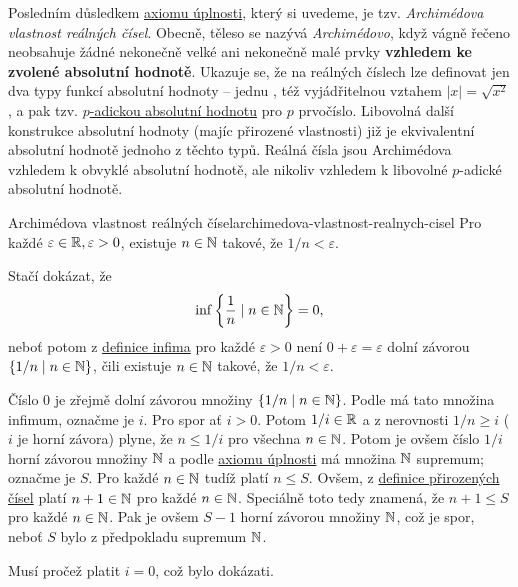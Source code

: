 Posledním důsledkem \hyperref[prop:axiom-uplnosti]{axiomu úplnosti}, který si
uvedeme, je tzv. \emph{Archimédova vlastnost reálných čísel}. Obecně, těleso se
nazývá \emph{Archimédovo}, když vágně řečeno neobsahuje žádné nekonečně velké
ani nekonečně malé prvky \textbf{vzhledem ke zvolené absolutní hodnotě}. Ukazuje
se, že na reálných číslech lze definovat jen dva typy funkcí absolutní hodnoty
-- jednu , též vyjádřitelnou vztahem $|x| = \sqrt{x^2}$, a pak tzv.
\href{https://en.wikipedia.org/wiki/P-adic_valuation}{$p$-adickou absolutní
hodnotu} pro $p$ prvočíslo. Libovolná další konstrukce absolutní hodnoty
(majíc přirozené vlastnosti) již je ekvivalentní absolutní hodnotě jednoho z
těchto typů. Reálná čísla jsou Archimédova vzhledem k obvyklé absolutní hodnotě,
ale nikoliv vzhledem k libovolné $p$-adické absolutní hodnotě.

\begin{lemma}{Archimédova vlastnost reálných
 čísel}{archimedova-vlastnost-realnych-cisel}
 Pro každé $\varepsilon \in \mathbb{R}, \varepsilon>0$, existuje $n \in \mathbb{N}$ takové, že
 $1 / n < \varepsilon$.
\end{lemma}
\begin{lemproof}
 Stačí dokázat, že
 \[
  \inf \left\{\frac{1}{n} \mid n \in \mathbb{N}\right\} = 0,
 \]
 neboť potom z \hyperref[def:supremum-a-infimum]{definice infima} pro každé
 $\varepsilon>0$ není $0 + \varepsilon = \varepsilon$ dolní závorou $\{1 / n
 \mid n \in \mathbb{N}\}$, čili existuje $n \in \mathbb{N}$ takové, že $1 / n < \varepsilon$.

Číslo $0$ je zřejmě dolní závorou množiny $\{1 / n \mid n \in \mathbb{N}\}$. Podle
 má tato množina infimum, označme je $i$. Pro
spor ať $i > 0$. Potom $1 / i \in \mathbb{R}$ a z nerovnosti $1 / n \geq i$ ($i$ je
horní závora) plyne, že $n \leq 1 / i$ pro všechna $n \in \mathbb{N}$. Potom je ovšem
číslo $1 / i$ horní závorou množiny $\mathbb{N}$ a podle
\hyperref[prop:axiom-uplnosti]{axiomu úplnosti} má množina $\mathbb{N}$ supremum;
označme je $S$. Pro každé $n \in \mathbb{N}$ tudíž platí $n \leq S$. Ovšem, z
\hyperref[def:prirozena-cisla]{definice přirozených čísel} platí $n+1 \in \mathbb{N}$
pro každé $n \in \mathbb{N}$. Speciálně toto tedy znamená, že $n + 1 \leq S$ pro každé
$n \in \mathbb{N}$. Pak je ovšem $S - 1$ horní závorou množiny $\mathbb{N}$, což je spor, neboť
$S$ bylo z předpokladu supremum $\mathbb{N}$.

Musí pročež platit $i = 0$, což bylo dokázati.
\end{lemproof}


